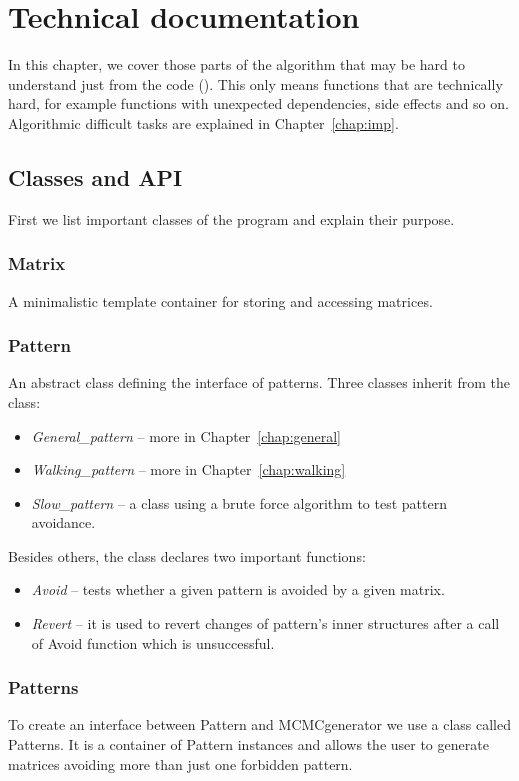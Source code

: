 \chapter{Technical documentation}
\label{chap:tdoc}
In this chapter, we cover those parts of the algorithm that may be hard to understand just from the code (\cite{program}). This only means functions that are technically hard, for example functions with unexpected dependencies, side effects and so on. Algorithmic difficult tasks are explained in Chapter~\ref{chap:imp}.

\section{Classes and API}
First we list important classes of the program and explain their purpose.

\subsection{Matrix}
A minimalistic template container for storing and accessing matrices.

\subsection{Pattern}
An abstract class defining the interface of patterns. Three classes inherit from the class:
\begin{itemize}
\item \emph{General\_pattern} -- more in Chapter~\ref{chap:general}
\item \emph{Walking\_pattern} -- more in Chapter~\ref{chap:walking}
\item \emph{Slow\_pattern} -- a class using a brute force algorithm to test pattern avoidance.
\end{itemize}
\label{patternapi}
Besides others, the class declares two important functions:
\begin{itemize}
\item \emph{Avoid} -- tests whether a given pattern is avoided by a given matrix.
\item \emph{Revert} -- it is used to revert changes of pattern's inner structures after a call of Avoid function which is unsuccessful.
\end{itemize}

\subsection{Patterns}
To create an interface between Pattern and MCMCgenerator we use a class called Patterns. It is a container of Pattern instances and allows the user to generate matrices avoiding more than just one forbidden pattern.

